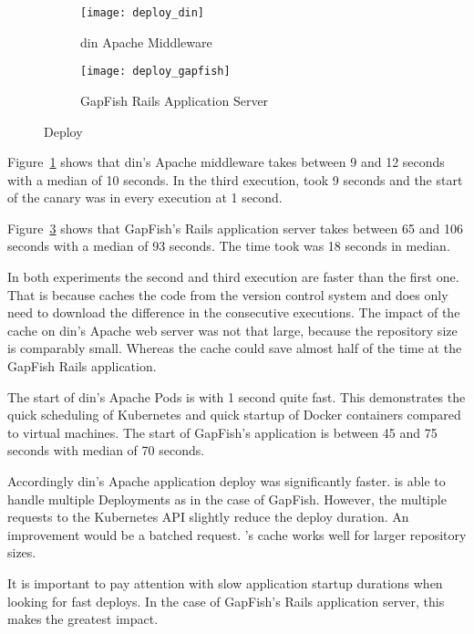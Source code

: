 \begin{figure}[htbp]
  \label{fig:deploy}
  \centering
  \begin{subfigure}{.5\textwidth}
    \texttt{[image: deploy\_din]}
    \caption{\gls{din} Apache Middleware}
    \label{fig:deploy_din}
  \end{subfigure}%
  \begin{subfigure}{.5\textwidth}
    \texttt{[image: deploy\_gapfish]}
    \caption[GapFish]{GapFish Rails Application Server}
    \label{fig:deploy_gapfish}
  \end{subfigure}
  \caption{Deploy}
\end{figure}

Figure~\ref{fig:deploy_din} shows that \gls{din}'s Apache middleware takes between 9 and 12
seconds with a median of 10 seconds. In the third execution, \deployer took 9 seconds and
the start of the canary was in every execution at 1 second.

Figure~\ref{fig:deploy_gapfish} shows that GapFish's Rails application server takes
between 65 and 106 seconds with a median of 93 seconds. The time \deployer took was 18
seconds in median.

In both experiments the second and third execution are faster than the first one. That is
because \deployer caches the code from the version control system and does only need to
download the difference in the consecutive executions. The impact of the cache on \gls{din}'s
Apache web server was not that large, because the repository size is comparably
small. Whereas the cache could save almost half of the time at the GapFish Rails
application.

The start of \gls{din}'s Apache Pods is with 1 second quite fast. This demonstrates the quick
scheduling of Kubernetes and quick startup of Docker containers compared to virtual
machines. The start of GapFish's application is between 45 and 75 seconds with median of
70 seconds.

Accordingly \gls{din}'s Apache application deploy was significantly faster. \deployer is able to
handle multiple Deployments as in the case of GapFish. However, the multiple requests to the
Kubernetes API slightly reduce the deploy duration. An improvement would be a
batched request. \deployer's cache works well for larger repository sizes.

It is important to pay attention with slow application startup durations when looking for
fast deploys. In the case of GapFish's Rails application server, this makes the
greatest impact.

